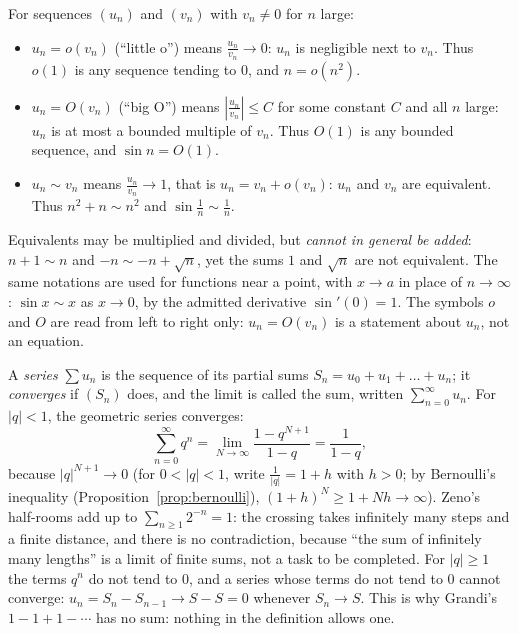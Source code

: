 \begin{reminder}
For sequences $(u_n)$ and $(v_n)$ with $v_n\ne0$ for $n$ large:
\begin{itemize}
\item $u_n=o(v_n)$ (``little o'') means $\frac{u_n}{v_n}\to0$: $u_n$ is negligible next to $v_n$. Thus $o(1)$ is any sequence tending to $0$, and $n=o(n^2)$.
\item $u_n=O(v_n)$ (``big O'') means $\left|\frac{u_n}{v_n}\right|\le C$ for some constant $C$ and all $n$ large: $u_n$ is at most a bounded multiple of $v_n$. Thus $O(1)$ is any bounded sequence, and $\sin n=O(1)$.
\item $u_n\sim v_n$ means $\frac{u_n}{v_n}\to1$, that is $u_n=v_n+o(v_n)$: $u_n$ and $v_n$ are equivalent. Thus $n^2+n\sim n^2$ and $\sin\frac1n\sim\frac1n$.
\end{itemize}
Equivalents may be multiplied and divided, but \emph{cannot in general be added}: $n+1\sim n$ and $-n\sim-n+\sqrt n$, yet the sums $1$ and $\sqrt n$ are not equivalent. The
same notations are used for functions near a point, with $x\to a$ in place of $n\to\infty$: $\sin x\sim x$ as $x\to0$, by the admitted derivative $\sin\prime(0)=1$.
The symbols $o$ and $O$ are read from left to right only: $u_n=O(v_n)$ is a statement about $u_n$, not an equation.
\end{reminder}

\begin{examplex}
A \emph{series} $\sum u_n$ is the sequence of its partial sums $S_n=u_0+u_1+\dots+u_n$; it \emph{converges} if $(S_n)$ does, and the limit is called
the sum, written $\sum_{n=0}^\infty u_n$. For $|q|<1$, the geometric series converges:
\[
\sum_{n=0}^\infty q^n=\lim_{N\to\infty}\frac{1-q^{N+1}}{1-q}=\frac1{1-q},
\]
because $|q|^{N+1}\to0$ (for $0<|q|<1$, write $\frac1{|q|}=1+h$ with $h>0$; by Bernoulli's inequality (Proposition~\ref{prop:bernoulli}), $(1+h)^{N}\ge1+Nh\to\infty$). Zeno's half-rooms add up to $\sum_{n\ge1}2^{-n}=1$:
the crossing takes infinitely many steps and a finite distance, and there is no contradiction, because ``the sum of infinitely many lengths'' is a
limit of finite sums, not a task to be completed. For $|q|\ge1$ the terms $q^n$ do not tend to $0$, and a series whose terms do not tend to $0$ cannot
converge: $u_n=S_n-S_{n-1}\to S-S=0$ whenever $S_n\to S$. This is why Grandi's $1-1+1-\cdots$ has no sum: nothing in the definition allows one.
\end{examplex}

